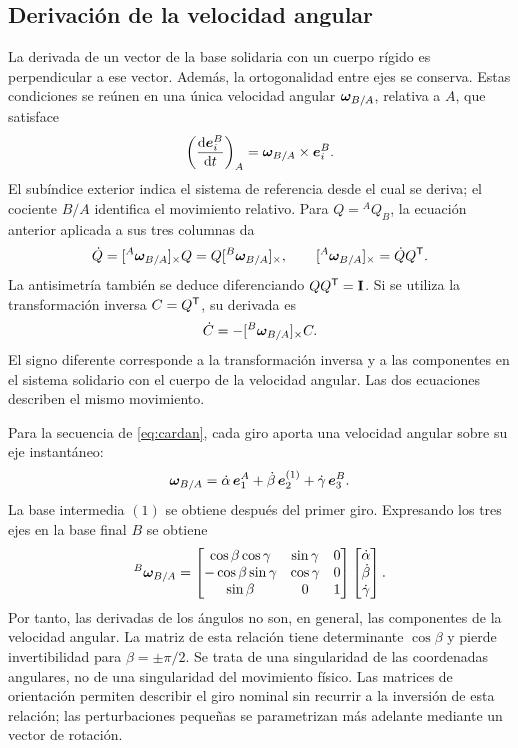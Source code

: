 \subsection{Derivación de la velocidad angular}
La derivada de un vector de la base solidaria con un cuerpo rígido es perpendicular a ese vector. Además, la ortogonalidad entre ejes se conserva. Estas condiciones se reúnen en una única velocidad angular $\bm{\omega}_{B/A}$, relativa a $A$, que satisface
\begin{equation}
 \left(\frac{\mathrm d\bm{e}_i^B}{\mathrm d t}\right)_A
 =\bm{\omega}_{B/A}\times\bm{e}_i^B.
 \label{eq:derivada-ejes}
\end{equation}
El subíndice exterior indica el sistema de referencia desde el cual se deriva; el cociente $B/A$ identifica el movimiento relativo. Para $Q={}^AQ_B$, la ecuación anterior aplicada a sus tres columnas da
\begin{equation}
 \dot Q=[{}^A\bm{\omega}_{B/A}]_\times Q
       =Q[{}^B\bm{\omega}_{B/A}]_\times,\qquad
 [ {}^A\bm{\omega}_{B/A}]_\times=\dot Q Q^\mathsf T.
 \label{eq:Qdot}
\end{equation}
La antisimetría también se deduce diferenciando $QQ^\mathsf T=\mathbf I$. Si se utiliza la transformación inversa $C=Q^\mathsf T$, su derivada es
\begin{equation}
 \dot C=-[{}^B\bm{\omega}_{B/A}]_\times C.
 \label{eq:Cdot}
\end{equation}
El signo diferente corresponde a la transformación inversa y a las componentes en el sistema solidario con el cuerpo de la velocidad angular. Las dos ecuaciones describen el mismo movimiento.

Para la secuencia de \eqref{eq:cardan}, cada giro aporta una velocidad angular sobre su eje instantáneo:
\begin{equation}
 \bm{\omega}_{B/A}
 =\dot\alpha\,\bm{e}_1^A
  +\dot\beta\,\bm{e}_2^{(1)}
  +\dot\gamma\,\bm{e}_3^B.
\end{equation}
La base intermedia $(1)$ se obtiene después del primer giro. Expresando los tres ejes en la base final $B$ se obtiene
\begin{equation}
 {}^B\bm{\omega}_{B/A}=
 \begin{bmatrix}
 \cos\beta\cos\gamma&\sin\gamma&0\\
 -\cos\beta\sin\gamma&\cos\gamma&0\\
 \sin\beta&0&1
 \end{bmatrix}
 \begin{bmatrix}\dot\alpha\\\dot\beta\\\dot\gamma\end{bmatrix}.
 \label{eq:cardan-velocidad}
\end{equation}
Por tanto, las derivadas de los ángulos no son, en general, las componentes de la velocidad angular. La matriz de esta relación tiene determinante $\cos\beta$ y pierde invertibilidad para $\beta=\pm\pi/2$. Se trata de una singularidad de las coordenadas angulares, no de una singularidad del movimiento físico. Las matrices de orientación permiten describir el giro nominal sin recurrir a la inversión de esta relación; las perturbaciones pequeñas se parametrizan más adelante mediante un vector de rotación.

